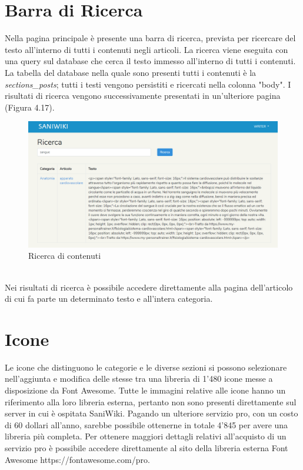 \documentclass[twoside]{supsistudent}
\begin{document}
\section{Barra di Ricerca}
Nella pagina principale è presente una barra di ricerca, prevista per ricercare del testo all'interno di tutti i contenuti negli articoli. La ricerca viene eseguita con una query sul database che cerca il testo immesso all'interno di tutti i contenuti. La tabella del database nella quale sono presenti tutti i contenuti è la \textit{sections\_posts}; tutti i testi vengono persistiti e ricercati nella colonna "body". I risultati di ricerca vengono successivamente presentati in un'ulteriore pagina (Figura 4.17).\\
\begin{figure}[!h]
\centering
\includegraphics[scale=0.4]{saniwiki_ricerca.png}
\caption{Ricerca di contenuti}
\end{figure}
\\
Nei risultati di ricerca è possibile accedere direttamente alla pagina dell'articolo di cui fa parte un determinato testo e all'intera categoria.

\section{Icone}
Le icone che distinguono le categorie e le diverse sezioni si possono selezionare nell'aggiunta e modifica delle stesse tra una libreria di 1'480 icone messe a disposizione da Font Awesome. Tutte le immagini relative alle icone hanno un riferimento alla loro libreria esterna, pertanto non sono presenti direttamente sul server in cui è ospitata SaniWiki. Pagando un ulteriore servizio pro, con un costo di 60 dollari all'anno, sarebbe possibile ottenerne in totale 4'845 per avere una libreria più completa. Per ottenere maggiori dettagli relativi all'acquisto di un servizio pro è possibile accedere direttamente al sito della libreria esterna Font Awesome https://fontawesome.com/pro.
\end{document}
